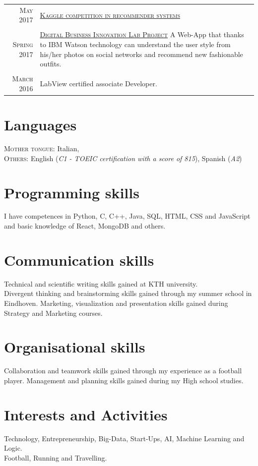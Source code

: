 \documentclass[a4paper,10pt]{article}
\begin{document}
\begin{tabular}{r|p{12cm}}
\textsc{May} 2017 &
\href{https://www.kaggle.com/c/recommender-system-2016-challenge-polimi/leaderboard}{\textsc{Kaggle competition in recommender systems}}  \\

\multicolumn{2}{c}{}\\

\textsc{Spring} 2017 &
\href{https://www.youtube.com/watch?v=3uLLvG1s0R0}{\textsc{Digital Business Innovation Lab Project}} \newline
\small{A Web-App that thanks to IBM Watson technology can understand the user style from his/her photos on social networks and recommend new fashionable outfits.} \\ 

\multicolumn{2}{c}{}\\

\textsc{March} 2016 & LabView certified associate Developer.\\

\end{tabular}

\section{Languages}
\textsc{Mother tongue:} Italian, \\ \textsc{Others:} English (\emph{C1 - TOEIC certification with a score of 815}), Spanish (\emph{A2}) 

\section{Programming skills}
I have competences in Python, C, C++, Java, SQL, HTML, CSS and JavaScript and basic knowledge of React, MongoDB and others.

\section{Communication skills}

Technical and scientific writing skills gained at KTH university. \\
Divergent thinking and brainstorming skills gained through my summer school in Eindhoven. \newline Marketing, visualization and presentation skills gained during Strategy and Marketing courses.

\section{Organisational skills}

Collaboration and teamwork skills gained through my experience as a football player. \newline
Management and planning skills gained during my High school studies.

\section{Interests and Activities}
Technology, Entrepreneurship, Big-Data, Start-Ups, AI, Machine Learning and Logic.\\
Football, Running and Travelling.
\end{document}

